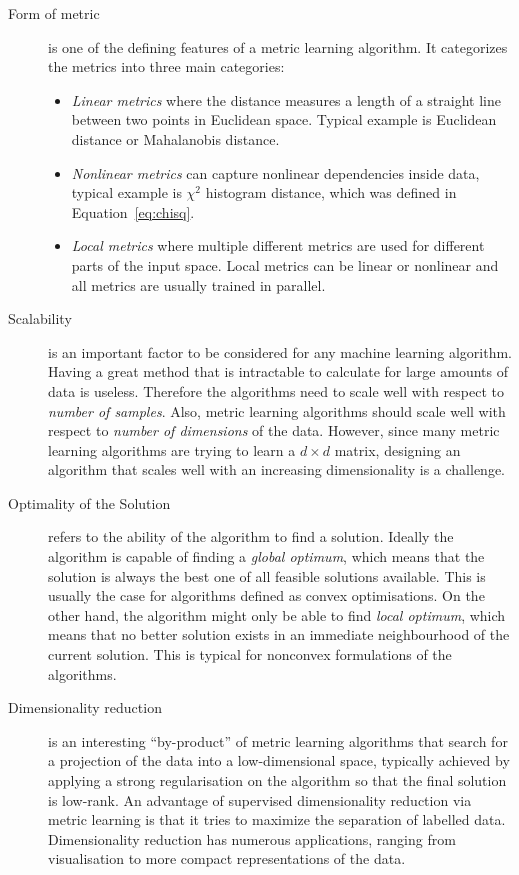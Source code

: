 \documentclass[12pt,a4paper]{report}
\begin{document}
\begin{description}
\item [Form of metric] is one of the defining features of a metric learning algorithm. It categorizes the metrics into three main categories: 
\begin{itemize}
\item \textit{Linear metrics} where the distance measures a length of a straight line between two points in Euclidean space. Typical example is Euclidean distance or Mahalanobis distance.
\item \textit{Nonlinear metrics} can capture nonlinear dependencies inside data, typical example is $\chi^2$ histogram distance, which was defined in Equation~\ref{eq:chisq}.
\item \textit{Local metrics} where multiple different metrics are used for different parts of the input space. Local metrics can be linear or nonlinear and all metrics are usually trained in parallel.
\end{itemize}

\item [Scalability] is an important factor to be considered for any machine learning algorithm. Having a great method that is intractable to calculate for large amounts of data is useless. Therefore the algorithms need to scale well with respect to \textit{number of samples}. Also, metric learning algorithms should scale well with respect to \textit{number of dimensions} of the data. However, since many metric learning algorithms are trying to learn a $d \times d$ matrix, designing an algorithm that scales well with an increasing dimensionality is a challenge.

\item [Optimality of the Solution] refers to the ability of the algorithm to find a solution. Ideally the algorithm is capable of finding a \textit{global optimum}, which means that the solution is always the best one of all feasible solutions available. This is usually the case for algorithms defined as convex optimisations. On the other hand, the algorithm might only be able to find \textit{local optimum}, which means that no better solution exists in an immediate neighbourhood of the current solution. This is typical for nonconvex formulations of the algorithms.

\item [Dimensionality reduction] is an interesting ``by-product'' of metric learning algorithms that search for a projection of the data into a low-dimensional space, typically achieved by applying a strong regularisation on the algorithm so that the final solution is low-rank. An advantage of supervised dimensionality reduction via metric learning is that it tries to maximize the separation of labelled data. Dimensionality reduction has numerous applications, ranging from visualisation to more compact representations of the data.
\end{description}
\end{document}
